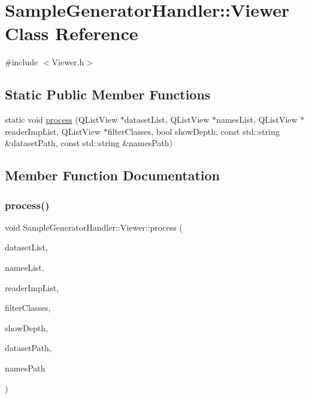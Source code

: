 \hypertarget{class_sample_generator_handler_1_1_viewer}{}\section{Sample\+Generator\+Handler\+:\+:Viewer Class Reference}
\label{class_sample_generator_handler_1_1_viewer}


{\ttfamily \#include $<$Viewer.\+h$>$}

\subsection*{Static Public Member Functions}
\begin{DoxyCompactItemize}
\item 
static void \hyperlink{class_sample_generator_handler_1_1_viewer_a49261aa867217f568842e0d460743691}{process} (Q\+List\+View $\ast$dataset\+List, Q\+List\+View $\ast$names\+List, Q\+List\+View $\ast$reader\+Imp\+List, Q\+List\+View $\ast$filter\+Classes, bool show\+Depth, const std\+::string \&dataset\+Path, const std\+::string \&names\+Path)
\end{DoxyCompactItemize}


\subsection{Member Function Documentation}
\mbox{\label{class_sample_generator_handler_1_1_viewer_a49261aa867217f568842e0d460743691}} 
\subsubsection{\texorpdfstring{process()}{process()}}
{\footnotesize\ttfamily void Sample\+Generator\+Handler\+::\+Viewer\+::process (\begin{DoxyParamCaption}\item[{Q\+List\+View $\ast$}]{dataset\+List,  }\item[{Q\+List\+View $\ast$}]{names\+List,  }\item[{Q\+List\+View $\ast$}]{reader\+Imp\+List,  }\item[{Q\+List\+View $\ast$}]{filter\+Classes,  }\item[{bool}]{show\+Depth,  }\item[{const std\+::string \&}]{dataset\+Path,  }\item[{const std\+::string \&}]{names\+Path }\end{DoxyParamCaption})\hspace{0.3cm}{\ttfamily [static]}}



